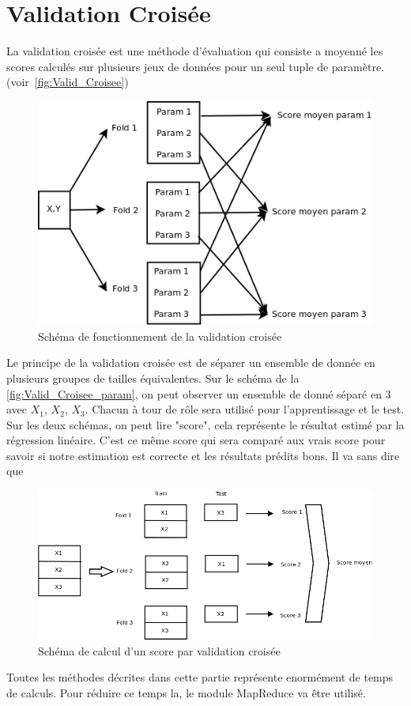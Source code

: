 \section{Validation Croisée}

La validation croisée est une méthode d'évaluation qui consiste a moyenné les scores calculés sur plusieurs jeux de données pour un seul tuple de paramètre. (voir~\autoref{fig:Valid_Croisee})


\begin{figure}[htpb]
	\centering
	\includegraphics[scale = 0.25]{images/Valid_Croisee}
	\caption{Schéma de fonctionnement de la validation croisée}
	\label{fig:Valid_Croisee}
\end{figure}


Le principe de la validation croisée est de séparer un ensemble de donnée en plusieurs groupes de tailles équivalentes. Sur le schéma de la  \autoref{fig:Valid_Croisee_param}, on peut observer un ensemble de donné séparé en 3 avec $X_{1}$, $X_{2}$, $X_{3}$.
Chacun à tour de rôle sera utilisé pour l'apprentissage et le test. 
Sur les deux schémas, on peut lire "score", cela représente le résultat estimé par la régression linéaire. C'est ce même score qui sera comparé aux vrais score pour savoir si notre estimation est correcte et les résultats prédits bons. 
Il va sans dire que 

\begin{figure}[htpb]
	\centering
	\includegraphics[scale = 0.25]{images/Valid_Croisee_param}
	\caption{Schéma de calcul d'un score par validation croisée}
	\label{fig:Valid_Croisee_param}
\end{figure}


Toutes les méthodes décrites dans cette partie représente enormément de temps de calculs. Pour réduire ce temps la, le module MapReduce va être utilisé. 